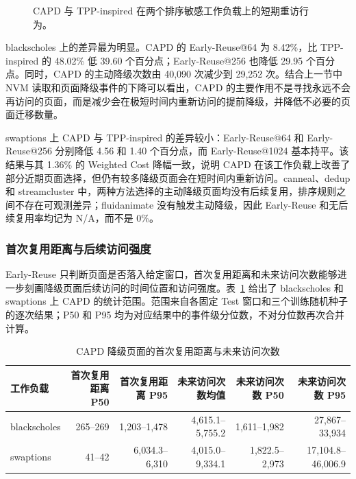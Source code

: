 \begin{figure}[htbp]
  \centering
  \caption{CAPD 与 TPP-inspired 在两个排序敏感工作负载上的短期重访行为。}
  \label{fig:capd-early-reuse}
\end{figure}

blackscholes 上的差异最为明显。CAPD 的 Early-Reuse@64 为 8.42\%，比 TPP-inspired 的 48.02\% 低 39.60 个百分点；Early-Reuse@256 也降低 29.95 个百分点。同时，CAPD 的主动降级次数由 40,090 次减少到 29,252 次。结合上一节中 NVM 读取和页面降级事件的下降可以看出，CAPD 的主要作用不是寻找永远不会再访问的页面，而是减少会在极短时间内重新访问的提前降级，并降低不必要的页面迁移数量。

swaptions 上 CAPD 与 TPP-inspired 的差异较小：Early-Reuse@64 和 Early-Reuse@256 分别降低 4.56 和 1.40 个百分点，而 Early-Reuse@1024 基本持平。该结果与其 1.36\% 的 Weighted Cost 降幅一致，说明 CAPD 在该工作负载上改善了部分近期页面选择，但仍有较多降级页面会在短时间内重新访问。canneal、dedup 和 streamcluster 中，两种方法选择的主动降级页面均没有后续复用，排序规则之间不存在可观测差异；fluidanimate 没有触发主动降级，因此 Early-Reuse 和无后续复用率均记为 N/A，而不是 0\%。

\subsubsection{\heiti 首次复用距离与后续访问强度}

Early-Reuse 只判断页面是否落入给定窗口，首次复用距离和未来访问次数能够进一步刻画降级页面后续访问的时间位置和访问强度。表~\ref{tab:capd-reuse-distance} 给出了 blackscholes 和 swaptions 上 CAPD 的统计范围。范围来自各固定 Test 窗口和三个训练随机种子的逐次结果；P50 和 P95 均为对应结果中的事件级分位数，不对分位数再次合并计算。

\begin{table}[htbp]
  \centering
  \scriptsize
  \caption{CAPD 降级页面的首次复用距离与未来访问次数}
  \label{tab:capd-reuse-distance}
  \renewcommand{\arraystretch}{1.15}
  \setlength{\tabcolsep}{3pt}
  \begin{tabular}{lrrrrr}
    \toprule
    工作负载 & 首次复用距离 P50 & 首次复用距离 P95 & 未来访问次数均值 & 未来访问次数 P50 & 未来访问次数 P95 \\
    \midrule
    blackscholes & 265--269 & 1,203--1,478 & 4,615.1--5,755.2 & 1,611--1,982 & 27,867--33,934 \\
    swaptions    & 41--42   & 6,034.3--6,310 & 4,015.0--9,334.1 & 1,822.5--2,973 & 17,104.8--46,006.9 \\
    \bottomrule
  \end{tabular}
\end{table}

